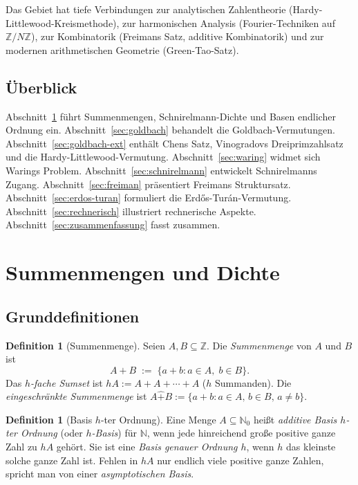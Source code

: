 \documentclass[12pt,a4paper]{amsart}
\theoremstyle{definition}
\newtheorem{definition}[theorem]{Definition}
\newcommand{\N}{\mathbb{N}}
\newcommand{\Z}{\mathbb{Z}}
\begin{document}
Das Gebiet hat tiefe Verbindungen zur analytischen Zahlentheorie
(Hardy-Littlewood-Kreismethode), zur harmonischen Analysis
(Fourier-Techniken auf $\Z/N\Z$), zur Kombinatorik
(Freimans Satz, additive Kombinatorik) und zur modernen arithmetischen
Geometrie (Green-Tao-Satz).

\subsection*{\"{U}berblick}

Abschnitt~\ref{sec:summenmengen} f\"{u}hrt Summenmengen, Schnirelmann-Dichte
und Basen endlicher Ordnung ein.
Abschnitt~\ref{sec:goldbach} behandelt die Goldbach-Vermutungen.
Abschnitt~\ref{sec:goldbach-ext} enth\"{a}lt Chens Satz, Vinogradovs
Dreiprimzahlsatz und die Hardy-Littlewood-Vermutung.
Abschnitt~\ref{sec:waring} widmet sich Warings Problem.
Abschnitt~\ref{sec:schnirelmann} entwickelt Schnirelmanns Zugang.
Abschnitt~\ref{sec:freiman} pr\"{a}sentiert Freimans Struktursatz.
Abschnitt~\ref{sec:erdos-turan} formuliert die Erd\H{o}s-Tur\'{a}n-Vermutung.
Abschnitt~\ref{sec:rechnerisch} illustriert rechnerische Aspekte.
Abschnitt~\ref{sec:zusammenfassung} fasst zusammen.

\section{Summenmengen und Dichte}\label{sec:summenmengen}

\subsection{Grunddefinitionen}

\begin{definition}[Summenmenge]
Seien $A, B \subseteq \Z$.  Die \emph{Summenmenge} von $A$ und $B$ ist
\[
  A + B \;:=\; \{ a + b : a \in A,\; b \in B \}.
\]
Das \emph{$h$-fache Sumset} ist $hA := A + A + \cdots + A$ ($h$ Summanden).
Die \emph{eingeschr\"{a}nkte Summenmenge} ist
$A \hat{+} B := \{a + b : a \in A,\, b \in B,\, a \neq b\}$.
\end{definition}

\begin{definition}[Basis $h$-ter Ordnung]\label{def:basis}
Eine Menge $A \subseteq \N_0$ hei\ss{}t \emph{additive Basis $h$-ter Ordnung}
(oder \emph{$h$-Basis}) f\"{u}r $\N$, wenn jede hinreichend gro\ss{}e positive
ganze Zahl zu $hA$ geh\"{o}rt.  Sie ist eine \emph{Basis genauer Ordnung $h$},
wenn $h$ das kleinste solche ganze Zahl ist.
Fehlen in $hA$ nur endlich viele positive ganze Zahlen, spricht man von
einer \emph{asymptotischen Basis}.
\end{definition}
\end{document}
